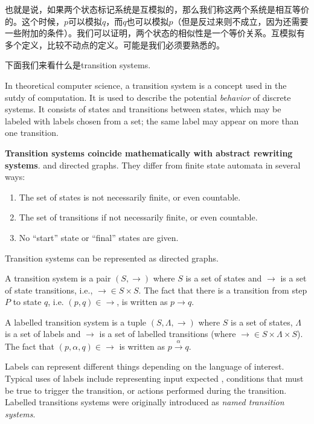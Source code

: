 也就是说，如果两个状态标记系统是互模拟的，那么我们称这两个系统是相互等价的。这个时候，$p$可以模拟$q$，而$q$也可以模拟$p$（但是反过来则不成立，因为还需要一些附加的条件）。我们可以证明，两个状态的相似性是一个等价关系。互模拟有多个定义，比较不动点的定义。可能是我们必须要熟悉的。

下面我们来看什么是transition systems.

In theoretical computer science, a transition system is a concept used in the sutdy of computation. It is used to describe the potential \emph{behavior} of discrete systems. It consists of states and transitions between states, which may be labeled with labels chosen from a set; the same label may appear on more than one transition. 

\textbf{Transition systems coincide mathematically with abstract rewriting systems}. and directed graphs. They differ from finite state automata in several ways:
\begin{enumerate}
\item The set of states is not necessarily finite, or even countable.
\item The set of transitions if not necessarily finite, or even countable.
\item No ``start'' state or ``final'' states are given.
\end{enumerate}
Transition systems can be represented as directed graphs.

\def\ltrans#1{\overset{#1}{\rightarrow}}

\begin{definition}
A transition system is a pair $(S,\rightarrow)$ where $S$ is a set of states and $\rightarrow$ is a set of state transitions, i.e., $\rightarrow \in S\times S$. The fact that there is a transition from step $P$ to state $q$, i.e. $(p,q)\in\rightarrow$, is written as $p\rightarrow q$.
\end{definition}

\begin{definition}
A labelled transition system is a tuple $(S,\Lambda,\rightarrow)$ where $S$ is a set of states, $\Lambda$ is a set of labels and $\rightarrow$ is a set of labelled transitions (where $\rightarrow \in S\times \Lambda\times S$). The fact that $(p, \alpha, q)\in \rightarrow$ is written as $p \overset{\alpha}{\rightarrow} q$.
\end{definition}

Labels can represent different things depending on the language of interest. Typical uses of labels include representing input expected , conditions that must be true to trigger the transition, or actions performed during the transition. Labelled transitions systems were originally introduced as \emph{named transition systems}.

